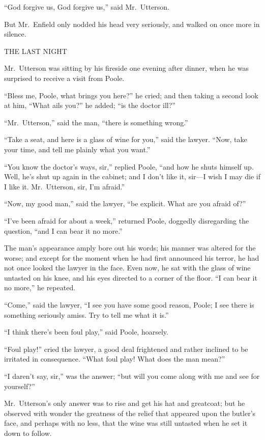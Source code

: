 \documentclass[12pt,openright]{book}
\begin{document}
“God forgive us, God forgive us,” said Mr. Utterson.

But Mr. Enfield only nodded his head very seriously, and walked on once more in silence.

THE LAST NIGHT

Mr. Utterson was sitting by his fireside one evening after dinner, when he was surprised to receive a visit from Poole.

“Bless me, Poole, what brings you here?” he cried; and then taking a second look at him, “What ails you?” he added; “is the doctor ill?”

“Mr. Utterson,” said the man, “there is something wrong.”

“Take a seat, and here is a glass of wine for you,” said the lawyer. “Now, take your time, and tell me plainly what you want.”

“You know the doctor’s ways, sir,” replied Poole, “and how he shuts himself up. Well, he’s shut up again in the cabinet; and I don’t like it, sir—I wish I may die if I like it. Mr. Utterson, sir, I’m afraid.”

“Now, my good man,” said the lawyer, “be explicit. What are you afraid of?”

“I’ve been afraid for about a week,” returned Poole, doggedly disregarding the question, “and I can bear it no more.”

The man’s appearance amply bore out his words; his manner was altered for the worse; and except for the moment when he had first announced his terror, he had not once looked the lawyer in the face. Even now, he sat with the glass of wine untasted on his knee, and his eyes directed to a corner of the floor. “I can bear it no more,” he repeated.

“Come,” said the lawyer, “I see you have some good reason, Poole; I see there is something seriously amiss. Try to tell me what it is.”

“I think there’s been foul play,” said Poole, hoarsely.

“Foul play!” cried the lawyer, a good deal frightened and rather inclined to be irritated in consequence. “What foul play! What does the man mean?”

“I daren’t say, sir,” was the answer; “but will you come along with me and see for yourself?”

Mr. Utterson’s only answer was to rise and get his hat and greatcoat; but he observed with wonder the greatness of the relief that appeared upon the butler’s face, and perhaps with no less, that the wine was still untasted when he set it down to follow.
\end{document}

